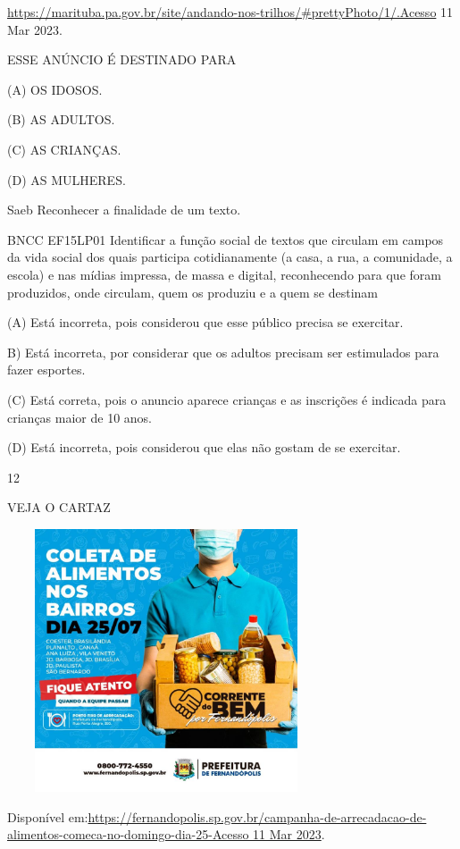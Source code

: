 {{{{{{\url{https://marituba.pa.gov.br/site/andando-nos-trilhos/\#prettyPhoto/1/.Acesso}
11 Mar 2023.

ESSE ANÚNCIO É DESTINADO PARA

(A) OS IDOSOS.

(B) AS ADULTOS.

(C) AS CRIANÇAS.

(D) AS MULHERES.

Saeb Reconhecer a finalidade de um texto.

BNCC EF15LP01 Identificar a função social de textos que circulam em
campos da vida social dos quais participa cotidianamente (a casa, a rua,
a comunidade, a escola) e nas mídias impressa, de massa e digital,
reconhecendo para que foram produzidos, onde circulam, quem os produziu
e a quem se destinam

(A) Está incorreta, pois considerou que esse público precisa se
exercitar.

B) Está incorreta, por considerar que os adultos precisam ser
estimulados para fazer esportes.

(C) Está correta, pois o anuncio aparece crianças e as inscrições é
indicada para crianças maior de 10 anos.

(D) Está incorreta, pois considerou que elas não gostam de se exercitar.

\num{12}

VEJA O CARTAZ

\includegraphics[width=3.71207in,height=3.06667in]{media/image171.jpeg}

Disponível
em:\href{https://fernandopolis.sp.gov.br/campanha-de-arrecadacao-de-alimentos-comeca-no-domingo-dia-25-Acesso\%2011\%20Mar\%202023}{https://fernandopolis.sp.gov.br/campanha-de-arrecadacao-de-alimentos-comeca-no-domingo-dia-25-Acesso
11 Mar 2023}.

}}}}}}
